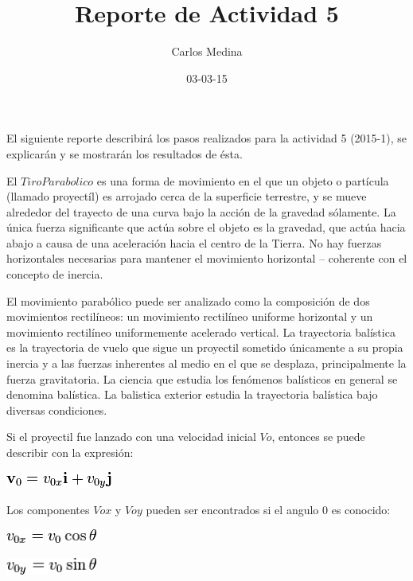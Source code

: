 \documentclass[12pt]{article}
\title{Reporte de Actividad 5}
\author{Carlos Medina}
\date{03-03-15}
\begin{document}
\maketitle


El siguiente reporte describirá los pasos realizados para la actividad 5 (2015-1), se explicarán y se mostrarán los resultados de ésta.




\hspace {0.5cm} El $Tiro Parabolico$ es una forma de movimiento en el que un objeto o partícula (llamado proyectíl) es arrojado cerca de la superficie terrestre, y se mueve alrededor del trayecto de una curva bajo la acción de la gravedad sólamente. La única fuerza significante que actúa sobre el objeto es la gravedad, que actúa hacia abajo a causa de una aceleración hacia el centro de la Tierra. No hay fuerzas horizontales necesarias para mantener el movimiento horizontal – coherente con el concepto de inercia. 

El movimiento parabólico puede ser analizado como la composición de dos movimientos rectilíneos: un movimiento rectilíneo uniforme horizontal y un movimiento rectilíneo uniformemente acelerado vertical.
La trayectoria balística es la trayectoria de vuelo que sigue un proyectil sometido únicamente a su propia inercia y a las fuerzas inherentes al medio en el que se desplaza, principalmente la fuerza gravitatoria. La ciencia que estudia los fenómenos balísticos en general se denomina balística. La balistica exterior estudia la trayectoria balística bajo diversas condiciones.

Si el proyectil fue lanzado con una velocidad inicial $Vo$, entonces se puede describir con la expresión:

\begin{center}
	\includegraphics[width=3.5cm]{velin.png}\\
\end{center}

Los componentes $Vox$ y $Voy$ pueden ser encontrados si el angulo $0$ es conocido:

\begin{center}
	\includegraphics[width=3cm]{velx.png}\\
\end{center}
\begin{center}
	\includegraphics[width=3cm]{vely.png}\\
\end{center}

\end{document}
